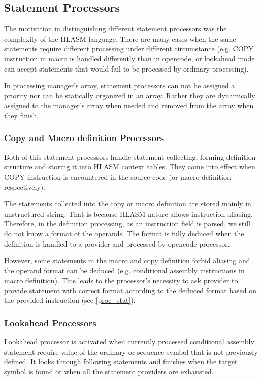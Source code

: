 \subsection{Statement Processors}
\label{sect_proc}

The motivation in distinguishing different statement processors was the complexity of the HLASM language. There are many cases when the same statements require different processing under different circumstance (e.g. COPY instruction in macro is handled differently than in opencode, or lookahead mode can accept statements that would fail to be processed by ordinary processing).

In processing manager's array, statement processors can not be assigned a priority nor can be statically organized in an array. Rather they are dynamically assigned to the manager's array when needed and removed from the array when they finish.


\subsubsection{Copy and Macro definition Processors}

Both of this statement processors handle statement collecting, forming definition structure and storing it into HLASM context tables. They come into effect when COPY instruction is encountered in the source code (or macro definition respectively). 

The statements collected into the copy or macro definition are stored mainly in unstructured string. That is because HLASM nature allows instruction aliasing. Therefore, in the definition processing, as an instruction field is parsed, we still do not know a format of the operands. The format is fully deduced when the definition is handled to a provider and processed by opencode processor.

However, some statements in the macro and copy definition forbid aliasing and the operand format can be deduced (e.g. conditional assembly instructions in macro definition). This leads to the processor's necessity to ask provider to provide statement with correct format according to the deduced format based on the provided instruction  (see \cref{proc_stat}).

\subsubsection{Lookahead Processors}

Lookahead processor is activated when currently processed conditional assembly statement require value of the ordinary or sequence symbol that is not previously defined. It looks through following statements and finishes when the target symbol is found or when all the statement providers are exhausted.

